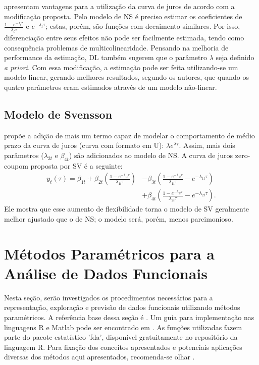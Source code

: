 \documentclass[
	12pt,				%
	openright,			%
	oneside,			%
	a4paper,			%
	english,			%
	brazil				%
	]{dissertacao-ufrgs-abntex2}
\begin{document}
 apresentam vantagens para a utilização da curva de juros
de acordo com a modificação proposta. Pelo modelo de NS é preciso estimar os coeficientes de $\frac{1-e^{-\lambda_{t}\tau}}{\lambda_{t}\tau}$
e $e^{-\lambda_{t}\tau}$; estas, porém, são funções com decaimento similares. Por isso,
diferenciação entre seus efeitos não pode ser facilmente estimada, tendo como consequência problemas de multicolinearidade. 
Pensando na melhoria de performance da estimação, DL também sugerem que o parâmetro $\lambda$ seja definido \emph{a priori}. Com essa modificação, a estimação pode ser feita utilizando-se um modelo linear, gerando melhores resultados, segundo os autores, que quando os quatro parâmetros eram estimados através de um modelo não-linear.

\subsection{Modelo de Svensson}

 propõe a adição de mais um termo capaz
de modelar o comportamento de médio prazo da curva de juros (curva
com formato em U): $\lambda e^{\lambda\tau}$. Assim, mais dois parâmetros
($\lambda_{2t}$ e $\beta_{4t}$) são adicionados ao modelo de NS.
A curva de juros zero-coupom proposta por SV é a seguinte:
\begin{equation}
\begin{split}
y_{t}(\tau)=\beta_{1t}+\beta_{2t}\left(\frac{1-e^{-\lambda_{1t}\tau}}{\lambda_{1t}\tau}\right) & -\beta_{3t} \left(\frac{1-e^{-\lambda_{1t}\tau}}{\lambda_{1t}\tau}-e^{-\lambda_{1t}\tau}\right) \\ &
+\beta_{4t}\left(\frac{1-e^{-\lambda_{2t}\tau}}{\lambda_{2t}\tau} - e^{-\lambda_{2t}\tau}\right).
\end{split}
\end{equation}
Ele mostra que esse aumento de flexibilidade torna o modelo de SV
geralmente melhor ajustado que o de NS; o modelo será, porém, menos
parcimonioso.

\section{Métodos Paramétricos para a Análise de Dados Funcionais\label{sec:Metodologias-para-modelos}}

Nesta seção, serão investigados os procedimentos necessários para
a representação, exploração e previsão de dados funcionais utilizando
métodos paramétricos. A referência base dessa seção é .
Um guia para implementação nas linguagens R e Matlab pode ser encontrado
em . As funções utilizadas fazem parte
do pacote estatístico 'fda', disponível gratuitamente no repositório
da linguagem R. Para fixação dos conceitos apresentados e potenciais
aplicações diversas dos métodos aqui apresentados, recomenda-se olhar
.
\end{document}

